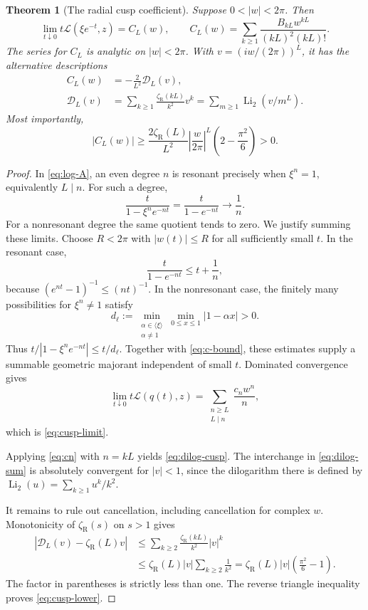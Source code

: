 \documentclass[11pt,a4paper]{article}
\numberwithin{equation}{section}
\newtheorem{theorem}{Theorem}[section]
\theoremstyle{definition}
\theoremstyle{remark}
\newcommand{\Li}{\operatorname{Li}}
\newcommand{\zR}{\zeta_{\mathrm R}}
\newcommand{\LL}{\mathcal L}
\begin{document}
\begin{theorem}[The radial cusp coefficient]\label{thm:cusp}
Suppose \(0<|w|<2\pi\). Then
\begin{equation}\label{eq:cusp-limit}
 \lim_{t\downarrow0}t\LL(\xi e^{-t},z)=C_L(w),
 \qquad
 C_L(w)=\sum_{k\ge1}\frac{B_{kL}w^{kL}}{(kL)^2(kL)!}.
\end{equation}
The series for \(C_L\) is analytic on \(|w|<2\pi\). With
\(v=(iw/(2\pi))^L\), it has the alternative descriptions
\begin{align}
 C_L(w)&=-\frac{2}{L^2}\mathscr D_L(v),\label{eq:dilog-cusp}\\
 \mathscr D_L(v)&=\sum_{k\ge1}\frac{\zR(kL)}{k^2}v^k
             =\sum_{m\ge1}\Li_2(v/m^L).\label{eq:dilog-sum}
\end{align}
Most importantly,
\begin{equation}\label{eq:cusp-lower}
 |C_L(w)|\ge
 \frac{2\zR(L)}{L^2}
 \left|\frac{w}{2\pi}\right|^L
 \left(2-\frac{\pi^2}{6}\right)>0.
\end{equation}
\end{theorem}
\begin{proof}
In \eqref{eq:log-A}, an even degree \(n\) is resonant precisely when \(\xi^n=1\), equivalently \(L\mid n\). For such a degree,
\[
 \frac{t}{1-\xi^ne^{-nt}}=\frac{t}{1-e^{-nt}}\longrightarrow\frac1n.
\]
For a nonresonant degree the same quotient tends to zero. We justify summing these limits. Choose \(R<2\pi\) with \(|w(t)|\le R\) for all sufficiently small \(t\). In the resonant case,
\[
 \frac{t}{1-e^{-nt}}\le t+\frac1n,
\]
because \((e^{nt}-1)^{-1}\le(nt)^{-1}\). In the nonresonant case, the finitely many possibilities for \(\xi^n\ne1\) satisfy
\[
 d_\ell:=\min_{\substack{\alpha\in\langle\xi\rangle\\\alpha\ne1}}
       \min_{0\le x\le1}|1-\alpha x|>0.
\]
Thus \(t/|1-\xi^ne^{-nt}|\le t/d_\ell\). Together with \eqref{eq:c-bound}, these estimates supply a summable geometric majorant independent of small \(t\). Dominated convergence gives
\[
 \lim_{t\downarrow0}t\LL(q(t),z)
 =\sum_{\substack{n\ge L\\L\mid n}}\frac{c_nw^n}{n},
\]
which is \eqref{eq:cusp-limit}.

Applying \eqref{eq:cn} with \(n=kL\) yields \eqref{eq:dilog-cusp}. The interchange in \eqref{eq:dilog-sum} is absolutely convergent for \(|v|<1\), since the dilogarithm there is defined by \(\Li_2(u)=\sum_{k\ge1}u^k/k^2\).

It remains to rule out cancellation, including cancellation for complex \(w\). Monotonicity of \(\zR(s)\) on \(s>1\) gives
\begin{align*}
 |\mathscr D_L(v)-\zR(L)v|
 &\le\sum_{k\ge2}\frac{\zR(kL)}{k^2}|v|^k\\
 &\le\zR(L)|v|\sum_{k\ge2}\frac1{k^2}
 =\zR(L)|v|\left(\frac{\pi^2}{6}-1\right).
\end{align*}
The factor in parentheses is strictly less than one. The reverse triangle inequality proves \eqref{eq:cusp-lower}.
\end{proof}
\end{document}

